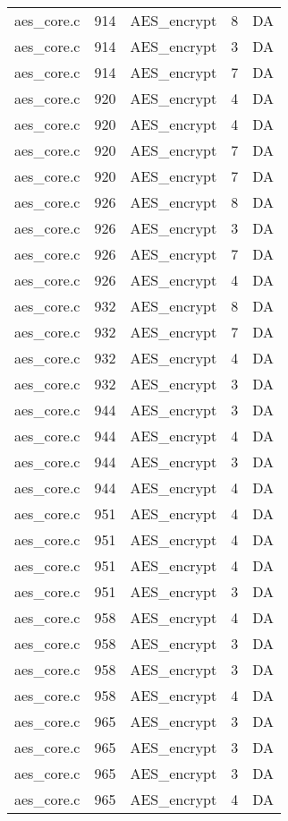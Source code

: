 \begin{table}[h]
{\begin{tabular}{clrrr}
aes\_core.c&914&AES\_encrypt&8 &DA\\
aes\_core.c&914&AES\_encrypt&3 &DA\\
aes\_core.c&914&AES\_encrypt&7 &DA\\
aes\_core.c&920&AES\_encrypt&4 &DA\\
aes\_core.c&920&AES\_encrypt&4 &DA\\
aes\_core.c&920&AES\_encrypt&7 &DA\\
aes\_core.c&920&AES\_encrypt&7 &DA\\
aes\_core.c&926&AES\_encrypt&8 &DA\\
aes\_core.c&926&AES\_encrypt&3 &DA\\
aes\_core.c&926&AES\_encrypt&7 &DA\\
aes\_core.c&926&AES\_encrypt&4 &DA\\
aes\_core.c&932&AES\_encrypt&8 &DA\\
aes\_core.c&932&AES\_encrypt&7 &DA\\
aes\_core.c&932&AES\_encrypt&4 &DA\\
aes\_core.c&932&AES\_encrypt&3 &DA\\
aes\_core.c&944&AES\_encrypt&3 &DA\\
aes\_core.c&944&AES\_encrypt&4 &DA\\
aes\_core.c&944&AES\_encrypt&3 &DA\\
aes\_core.c&944&AES\_encrypt&4 &DA\\
aes\_core.c&951&AES\_encrypt&4 &DA\\
aes\_core.c&951&AES\_encrypt&4 &DA\\
aes\_core.c&951&AES\_encrypt&4 &DA\\
aes\_core.c&951&AES\_encrypt&3 &DA\\
aes\_core.c&958&AES\_encrypt&4 &DA\\
aes\_core.c&958&AES\_encrypt&3 &DA\\
aes\_core.c&958&AES\_encrypt&3 &DA\\
aes\_core.c&958&AES\_encrypt&4 &DA\\
aes\_core.c&965&AES\_encrypt&3 &DA\\
aes\_core.c&965&AES\_encrypt&3 &DA\\
aes\_core.c&965&AES\_encrypt&3 &DA\\
aes\_core.c&965&AES\_encrypt&4 &DA\\
\hline
\end{tabular}
}
\end{table}